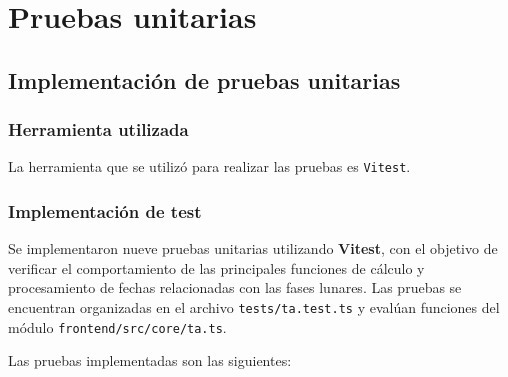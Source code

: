 
\chapter{Pruebas unitarias}

\section{Implementación de pruebas unitarias}
\subsection{Herramienta utilizada}
La herramienta que se utilizó para realizar las pruebas es \texttt{Vitest}.

\subsection{Implementación de test}

Se implementaron nueve pruebas unitarias utilizando \textbf{Vitest}, con el objetivo de verificar el comportamiento de las principales funciones de cálculo y procesamiento de fechas relacionadas con las fases lunares. Las pruebas se encuentran organizadas en el archivo \texttt{tests/ta.test.ts} y evalúan funciones del módulo \texttt{frontend/src/core/ta.ts}.

Las pruebas implementadas son las siguientes:

